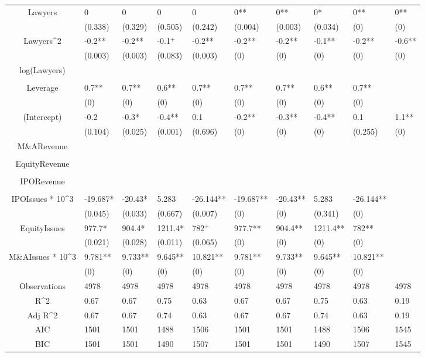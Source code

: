 \documentclass{article}
\begin{document}
\begin{table}[H]
\begin{tabular}{|clllllllll|}
Lawyers & 0 & 0 & 0 & 0 & 0** & 0** & 0* & 0** & 0** \\ 
   & (0.338) & (0.329) & (0.505) & (0.242) & (0.004) & (0.003) & (0.034) & (0) & (0) \\ 
  Lawyers^2 & -0.2** & -0.2** & -0.1$^{+}$ & -0.2** & -0.2** & -0.2** & -0.1** & -0.2** & -0.6** \\ 
   & (0.003) & (0.003) & (0.083) & (0.003) & (0) & (0) & (0) & (0) & (0) \\ 
  log(Lawyers) &  &  &  &  &  &  &  &  &  \\ 
   &  &  &  &  &  &  &  &  &  \\ 
  Leverage & 0.7** & 0.7** & 0.6** & 0.7** & 0.7** & 0.7** & 0.6** & 0.7** &  \\ 
   & (0) & (0) & (0) & (0) & (0) & (0) & (0) & (0) &  \\ 
  (Intercept) & -0.2 & -0.3* & -0.4** & 0.1 & -0.2** & -0.3** & -0.4** & 0.1 & 1.1** \\ 
   & (0.104) & (0.025) & (0.001) & (0.696) & (0) & (0) & (0) & (0.255) & (0) \\ 
  M\&ARevenue &  &  &  &  &  &  &  &  &  \\ 
   &  &  &  &  &  &  &  &  &  \\ 
  EquityRevenue &  &  &  &  &  &  &  &  &  \\ 
   &  &  &  &  &  &  &  &  &  \\ 
  IPORevenue &  &  &  &  &  &  &  &  &  \\ 
   &  &  &  &  &  &  &  &  &  \\ 
  IPOIssues * 10^3 & -19.687* & -20.43* & 5.283 & -26.144** & -19.687** & -20.43** & 5.283 & -26.144** &  \\ 
   & (0.045) & (0.033) & (0.667) & (0.007) & (0) & (0) & (0.341) & (0) &  \\ 
  EquityIssues & 977.7* & 904.4* & 1211.4* & 782$^{+}$ & 977.7** & 904.4** & 1211.4** & 782** &  \\ 
   & (0.021) & (0.028) & (0.011) & (0.065) & (0) & (0) & (0) & (0) &  \\ 
  M\&AIssues * 10^3 & 9.781** & 9.733** & 9.645** & 10.821** & 9.781** & 9.733** & 9.645** & 10.821** &  \\ 
   & (0) & (0) & (0) & (0) & (0) & (0) & (0) & (0) &  \\ 
  \hline 
 Observations & 4978 & 4978 & 4978 & 4978 & 4978 & 4978 & 4978 & 4978 & 4978 \\ 
  R^2 & 0.67 & 0.67 & 0.75 & 0.63 & 0.67 & 0.67 & 0.75 & 0.63 & 0.19 \\ 
  Adj R^2 & 0.67 & 0.67 & 0.74 & 0.63 & 0.67 & 0.67 & 0.74 & 0.63 & 0.19 \\ 
  AIC & 1501 & 1501 & 1488 & 1506 & 1501 & 1501 & 1488 & 1506 & 1545 \\ 
  BIC & 1501 & 1501 & 1490 & 1507 & 1501 & 1501 & 1490 & 1507 & 1545 \\ 
   \hline
\end{tabular}
 
\end{table}
\end{document}

